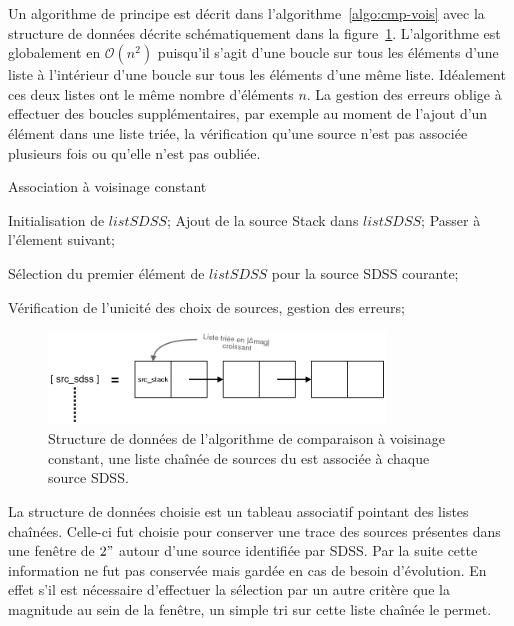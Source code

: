 Un algorithme de principe est décrit dans l'algorithme~\ref{algo:cmp-vois} avec la structure de données décrite schématiquement dans la figure~\ref{fig:sdd-vois}. L'algorithme est globalement en $\mathcal{O}(n^2)$ puisqu'il s'agit d'une boucle sur tous les éléments d'une liste à l'intérieur d'une boucle sur tous les éléments d'une même liste. Idéalement ces deux listes ont le même nombre d'éléments $n$. La gestion des erreurs oblige à effectuer des boucles supplémentaires, par exemple au moment de l'ajout d'un élément dans une liste triée, la vérification qu'une source n'est pas associée plusieurs fois ou qu'elle n'est pas oubliée.
	\begin{algorithm}
		\caption{Association à voisinage constant}
		\label{algo:cmp-vois}
		\begin{algorithmic}[1]
				\State Initialisation de $listSDSS$; 
						\State Ajout de la source Stack dans $listSDSS$;
					\Else
						\State Passer à l'élement suivant;
					\EndIf
				\EndFor

				\State Sélection du premier élément de $listSDSS$ pour la source SDSS courante;

			\EndFor

			\State Vérification de l'unicité des choix de sources, gestion des erreurs;
		\end{algorithmic}
	\end{algorithm}

	\begin{figure}[h]
		\centering
		\includegraphics[width=0.8\textwidth]{img/sdd-mapsrc.png}
		\caption[Structure de données de la comparaison à voisinage constant]{Structure de données de l'algorithme de comparaison à voisinage constant, une liste chaînée de sources du \stack{} est associée à chaque source SDSS.}
		\label{fig:sdd-vois}
	\end{figure}

La structure de données choisie est un tableau associatif pointant des listes chaînées. Celle-ci fut choisie pour conserver une trace des sources présentes dans une fenêtre de $2"$ autour d'une source identifiée par SDSS. Par la suite cette information ne fut pas conservée mais gardée en cas de besoin d'évolution. En effet s'il est nécessaire d'effectuer la sélection par un autre critère que la magnitude au sein de la fenêtre, un simple tri sur cette liste chaînée le permet.

